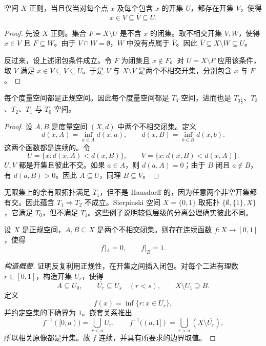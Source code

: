 \begin{proposition}[正则性的闭包刻画]
空间 $X$ 正则，当且仅当对每个点 $x$ 及每个包含 $x$ 的开集 $U$，都存在开集 $V$，使得
\[
    x\in V\subseteq \overline{V}\subseteq U.
\]
\end{proposition}

\begin{proof}
先设 $X$ 正则。集合 $F=X\setminus U$ 是不含 $x$ 的闭集。取不相交开集 $V,W$，使得 $x\in V$ 且 $F\subseteq W$。由于 $V\cap W=\emptyset$，$W$ 中没有点属于 $\overline{V}$。因此 $\overline{V}\subseteq X\setminus W\subseteq U$。

反过来，设上述闭包条件成立。令 $F$ 为闭集且 $x\notin F$。对 $U=X\setminus F$ 应用该条件，取 $V$ 满足 $x\in V\subseteq\overline{V}\subseteq U$。于是 $V$ 与 $X\setminus\overline{V}$ 是两个不相交开集，分别包含 $x$ 与 $F$。
\end{proof}

\begin{theorem}[度量空间是正规空间]
每个度量空间都是正规空间。因此每个度量空间都是 $T_4$ 空间，进而也是 $T_{3\frac12}$、$T_3$、$T_2$、$T_1$ 与 $T_0$ 空间。
\end{theorem}

\begin{proof}
设 $A,B$ 是度量空间 $(X,d)$ 中两个不相交闭集。定义
\[
    d(x,A)=\inf_{a\in A}d(x,a),\qquad d(x,B)=\inf_{b\in B}d(x,b).
\]
这两个函数都是连续的。令
\[
    U=\{x:d(x,A)<d(x,B)\},\qquad
    V=\{x:d(x,B)<d(x,A)\}.
\]
$U,V$ 都是开集且彼此不交。如果 $a\in A$，则 $d(a,A)=0$；由于 $B$ 闭且 $a\notin B$，有 $d(a,B)>0$。因此 $A\subseteq U$，同理 $B\subseteq V$。
\end{proof}

\begin{example}[为什么假设不可省略]
无限集上的余有限拓扑满足 $T_1$，但不是 Hausdorff 的，因为任意两个非空开集都有交。因此蕴含 $T_1\Rightarrow T_2$ 不成立。Sierpinski 空间 $X=\{0,1\}$ 取拓扑 $\{\emptyset,\{1\},X\}$，它满足 $T_0$，但不满足 $T_1$。这些例子说明较低层级的分离公理确实彼此不同。
\end{example}

\begin{theorem}[Urysohn 引理]
设 $X$ 是正规空间，$A,B\subseteq X$ 是两个不相交闭集。则存在连续函数 $f:X\to[0,1]$，使得
\[
    f|_A=0,\qquad f|_B=1.
\]
\end{theorem}

\begin{proof}[构造概要]
证明反复利用正规性，在开集之间插入闭包。对每个二进有理数 $r\in[0,1]$，构造开集 $U_r$，使得
\[
    A\subseteq U_0,
    \qquad \overline{U_r}\subseteq U_s\quad(r<s),
    \qquad X\setminus U_1\supseteq B.
\]
定义
\[
    f(x)=\inf\{r:x\in U_r\},
\]
并约定空集的下确界为 $1$。嵌套关系推出
\[
    f^{-1}([0,a))=\bigcup_{r<a}U_r,
    \qquad
    f^{-1}((a,1])=\bigcup_{r>a}(X\setminus\overline{U_r}),
\]
所以相关原像都是开集。故 $f$ 连续，并具有所要求的边界取值。
\end{proof}

